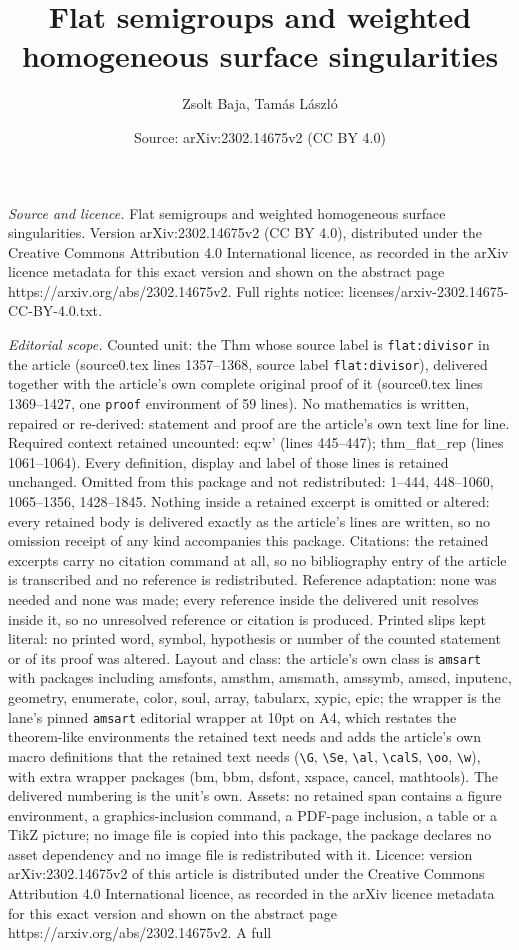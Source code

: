 \documentclass[10pt,a4paper]{amsart}
\title[Flat semigroups and weighted homogeneous surface singulariti]{Flat semigroups and weighted homogeneous surface singularities}
\author{Zsolt Baja, Tam\'as L\'aszl\'o}
\date{Source: arXiv:2302.14675v2 (CC BY 4.0)}
\begin{document}
\maketitle

\noindent\emph{Source and licence.} Flat semigroups and weighted homogeneous surface singularities. Version arXiv:2302.14675v2 (CC BY 4.0), distributed under the Creative Commons Attribution 4.0 International licence, as recorded in the arXiv licence metadata for this exact version and shown on the abstract page https://arxiv.org/abs/2302.14675v2. Full rights notice: licenses/arxiv-2302.14675-CC-BY-4.0.txt.\par\smallskip

\noindent\textit{Editorial scope.} Counted unit: the Thm whose source label is \texttt{flat:divisor} in the article (source0.tex lines 1357--1368, source label \texttt{flat:divisor}), delivered together with the article's own complete original proof of it (source0.tex lines 1369--1427, one \texttt{proof} environment of 59 lines). No mathematics is written, repaired or re-derived: statement and proof are the article's own text line for line. Required context retained uncounted: eq:w' (lines 445--447); thm\_flat\_rep (lines 1061--1064). Every definition, display and label of those lines is retained unchanged. Omitted from this package and not redistributed: 1--444, 448--1060, 1065--1356, 1428--1845. Nothing inside a retained excerpt is omitted or altered: every retained body is delivered exactly as the article's lines are written, so no omission receipt of any kind accompanies this package. Citations: the retained excerpts carry no citation command at all, so no bibliography entry of the article is transcribed and no reference is redistributed. Reference adaptation: none was needed and none was made; every reference inside the delivered unit resolves inside it, so no unresolved reference or citation is produced. Printed slips kept literal: no printed word, symbol, hypothesis or number of the counted statement or of its proof was altered. Layout and class: the article's own class is \texttt{amsart} with packages including amsfonts, amsthm, amsmath, amssymb, amscd, inputenc, geometry, enumerate, color, soul, array, tabularx, xypic, epic; the wrapper is the lane's pinned \texttt{amsart} editorial wrapper at 10pt on A4, which restates the theorem-like environments the retained text needs and adds the article's own macro definitions that the retained text needs (\texttt{\textbackslash G}, \texttt{\textbackslash Se}, \texttt{\textbackslash al}, \texttt{\textbackslash calS}, \texttt{\textbackslash oo}, \texttt{\textbackslash w}), with extra wrapper packages (bm, bbm, dsfont, xspace, cancel, mathtools). The delivered numbering is the unit's own. Assets: no retained span contains a figure environment, a graphics-inclusion command, a PDF-page inclusion, a table or a TikZ picture; no image file is copied into this package, the package declares no asset dependency and no image file is redistributed with it. Licence: version arXiv:2302.14675v2 of this article is distributed under the Creative Commons Attribution 4.0 International licence, as recorded in the arXiv licence metadata for this exact version and shown on the abstract page https://arxiv.org/abs/2302.14675v2. A full 
\end{document}
